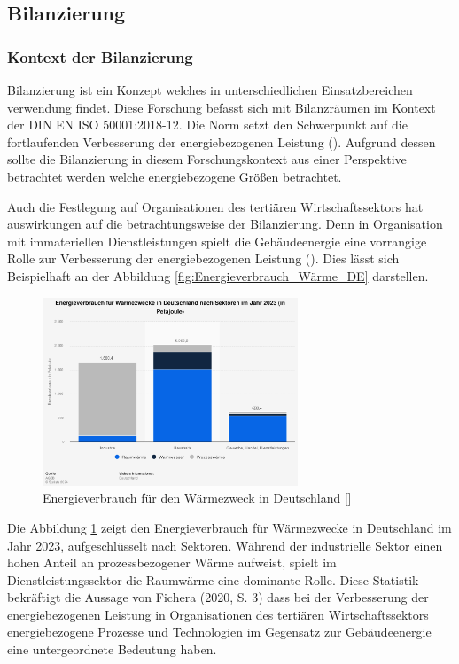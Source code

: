 \subsection{Bilanzierung}

\subsubsection{Kontext der Bilanzierung}

Bilanzierung ist ein Konzept welches in unterschiedlichen Einsatzbereichen verwendung findet. Diese Forschung befasst sich mit Bilanzräumen 
im Kontext der DIN EN ISO 50001:2018-12. Die Norm setzt den Schwerpunkt auf die fortlaufenden Verbesserung der energiebezogenen Leistung 
(\cite[Kapitel 0.2]{DIN50001.2018}). Aufgrund dessen sollte die Bilanzierung in diesem Forschungskontext aus einer Perspektive betrachtet werden welche 
energiebezogene Größen betrachtet.

Auch die Festlegung auf Organisationen des tertiären Wirtschaftssektors hat auswirkungen auf die betrachtungsweise der Bilanzierung. 
Denn in Organisation mit immateriellen Dienstleistungen spielt die Gebäudeenergie eine vorrangige Rolle zur Verbesserung der energiebezogenen 
Leistung (\cite[S. 3]{Fichera.2020}). 
Dies lässt sich Beispielhaft an der Abbildung \eqref{fig:Energieverbrauch_Wärme_DE} darstellen.

\begin{figure}[H]
    \centering
    \includegraphics[width=0.68\textwidth]{../../Ressourcen/Bilder/Energieverbrauch_für_Wärmezweck_DE.jpg}
    \caption{Energieverbrauch für den Wärmezweck in Deutschland [\cite{AGEB.2024}]}
    \label{fig:Energieverbrauch_Wärme_DE}
\end{figure}

Die Abbildung \ref{fig:Energieverbrauch_Wärme_DE} zeigt den Energieverbrauch für Wärmezwecke in Deutschland im Jahr 2023, aufgeschlüsselt nach Sektoren. 
Während der industrielle Sektor einen hohen Anteil an prozessbezogener Wärme aufweist, spielt im Dienstleistungssektor die Raumwärme 
eine dominante Rolle.
Diese Statistik bekräftigt die Aussage von Fichera (2020, S. 3) dass bei der Verbesserung der energiebezogenen Leistung in Organisationen des tertiären 
Wirtschaftssektors energiebezogene Prozesse und Technologien im Gegensatz zur Gebäudeenergie eine untergeordnete Bedeutung haben. 

